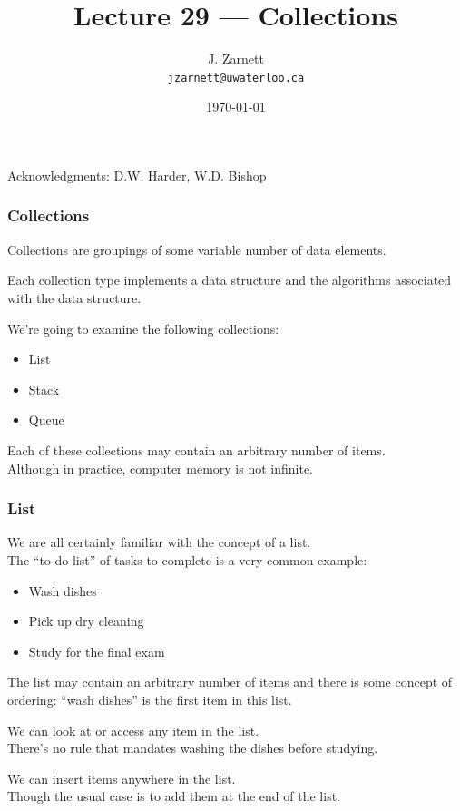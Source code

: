 

\title{Lecture 29 --- Collections}

\author{J. Zarnett\\
\texttt{jzarnett@uwaterloo.ca}}
\date{\today}



\begin{frame}
  \titlepage
  
  \begin{center}
  \small{Acknowledgments: D.W. Harder, W.D. Bishop}
  \end{center}
\end{frame}

\begin{frame}
\frametitle{Collections}

Collections are groupings of some variable number of data elements.

Each collection type implements a data structure and the algorithms associated with the data structure.

We're going to examine the following collections:

\begin{itemize}
	\item List
	\item Stack
	\item Queue
\end{itemize}

Each of these collections may contain an arbitrary number of items.\\
\quad Although in practice, computer memory is not infinite.

\end{frame}

\begin{frame}
\frametitle{List}

We are all certainly familiar with the concept of a list.\\
\quad The ``to-do list'' of tasks to complete is a very common example:
\begin{itemize}
	\item Wash dishes
	\item Pick up dry cleaning
	\item Study for the final exam
\end{itemize}

The list may contain an arbitrary number of items and there is some concept of ordering: ``wash dishes'' is the first item in this list.

We can look at or access any item in the list.\\
\quad There's no rule that mandates washing the dishes before studying.

We can insert items anywhere in the list.\\
\quad Though the usual case is to add them at the end of the list.

\end{frame}


